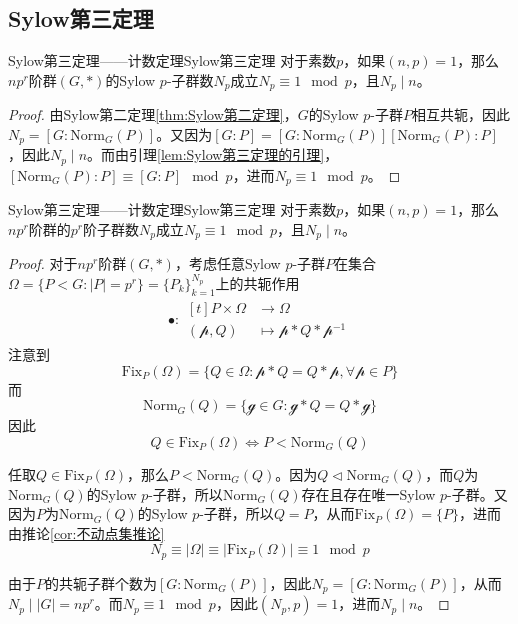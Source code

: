 \subsection{Sylow第三定理}

\begin{theorem}{Sylow第三定理——计数定理}{Sylow第三定理}
	对于素数$p$，如果$(n,p)=1$，那么$np^r$阶群$(G,*)$的Sylow $p$-子群数$N_p$成立$N_p\equiv 1\mod p$，且$N_p\mid n$。
\end{theorem}

\begin{proof}
	由Sylow第二定理\ref{thm:Sylow第二定理}，$G$的Sylow $p$-子群$P$相互共轭，因此$N_p=[G:\mathrm{Norm}_G(P)]$。又因为$[G:P]=[G:\mathrm{Norm}_G(P)][\mathrm{Norm}_G(P):P]$，因此$N_p\mid n$。而由引理\ref{lem:Sylow第三定理的引理}，$[\mathrm{Norm}_G(P):P]\equiv [G:P]\mod p$，进而$N_p\equiv 1\mod p$。
\end{proof}

\begin{theorem}{Sylow第三定理——计数定理}{Sylow第三定理}
	对于素数$p$，如果$(n,p)=1$，那么$np^r$阶群的$p^r$阶子群数$N_p$成立$N_p\equiv 1\mod p$，且$N_p\mid n$。
\end{theorem}

\begin{proof}
	对于$np^r$阶群$(G,*)$，考虑任意Sylow $p$-子群$P$在集合$\Omega=\{ P<G:|P|=p^r \}=\{ P_k \}_{k=1}^{N_p}$上的共轭作用
	\begin{align*}
		\bullet:\begin{aligned}[t]
			P\times \Omega&\longrightarrow\Omega\\
			(\mathcal{p},Q)&\longmapsto \mathcal{p}*Q*\mathcal{p}^{-1}
		\end{aligned}
	\end{align*}
	注意到
	$$
	\mathrm{Fix}_{P}(\Omega)=\{ Q\in\Omega:\mathcal{p}*Q=Q*\mathcal{p},\forall \mathcal{p}\in P \}
	$$
	而
	$$
	\mathrm{Norm}_G(Q)=\{ \mathcal{g}\in G:\mathcal{g}*Q=Q*\mathcal{g} \}
	$$
	因此
	$$
	Q\in\mathrm{Fix}_P(\Omega)\iff P<\mathrm{Norm}_G(Q)
	$$
	
	任取$Q\in\mathrm{Fix}_P(\Omega)$，那么$P<\mathrm{Norm}_G(Q)$。因为$Q\lhd \mathrm{Norm}_G(Q)$，而$Q$为$\mathrm{Norm}_G(Q)$的Sylow $p$-子群，所以$\mathrm{Norm}_G(Q)$存在且存在唯一Sylow $p$-子群。又因为$P$为$\mathrm{Norm}_G(Q)$的Sylow $p$-子群，所以$Q=P$，从而$\mathrm{Fix}_P(\Omega)=\{P\}$，进而由推论\ref{cor:不动点集推论}
	$$
	N_p\equiv |\Omega|\equiv |\mathrm{Fix}_P(\Omega)|\equiv 1\mod p
	$$
	
	由于$P$的共轭子群个数为$[G:\mathrm{Norm}_G(P)]$，因此$N_p=[G:\mathrm{Norm}_G(P)]$，从而$N_p\mid |G|=np^r$。而$N_p\equiv 1\mod p$，因此$(N_p,p)=1$，进而$N_p\mid n$。
\end{proof}


